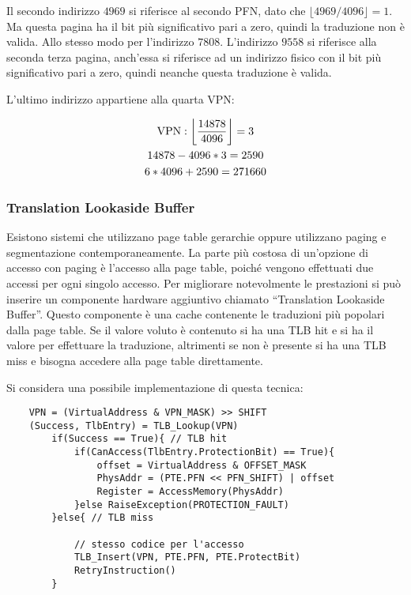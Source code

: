 \documentclass{article}
\numberwithin{equation}{subsection}
\begin{document}
Il secondo indirizzo $4969$ si riferisce al secondo PFN, dato che $\lfloor4969/4096\rfloor=1$. Ma questa pagina ha il bit più significativo pari a zero, quindi la traduzione 
non è valida. Allo stesso modo per l'indirizzo $7808$. L'indirizzo $9558$ si riferisce alla seconda terza pagina, anch'essa si riferisce ad un indirizzo fisico con 
il bit più significativo pari a zero, quindi neanche questa traduzione è valida. 

L'ultimo indirizzo appartiene alla quarta VPN: 

\begin{gather*}
    \mathrm{VPN}:\left\lfloor\displaystyle\frac{14878}{4096}\right\rfloor=3\\
    14878-4096*3=2590\\
    6*4096+2590=27166\theequation
\end{gather*}

\subsubsection{Translation Lookaside Buffer}

Esistono sistemi che utilizzano page table gerarchie oppure utilizzano paging e segmentazione contemporaneamente. 
La parte più costosa di un'opzione di accesso con paging è l'accesso alla page table, poiché vengono effettuati due accessi per ogni singolo accesso. 
Per migliorare notevolmente le prestazioni si può 
inserire un componente hardware aggiuntivo chiamato ``Translation Lookaside Buffer''. Questo componente è una cache contenente le traduzioni più popolari 
dalla page table. Se il valore voluto è contenuto si ha una TLB hit e si ha il valore per effettuare la traduzione, altrimenti se non è presente si ha una TLB miss 
e bisogna accedere alla page table direttamente. 


Si considera una possibile implementazione di questa tecnica: 

\begin{verbatim}
    VPN = (VirtualAddress & VPN_MASK) >> SHIFT
    (Success, TlbEntry) = TLB_Lookup(VPN)
        if(Success == True){ // TLB hit
            if(CanAccess(TlbEntry.ProtectionBit) == True){
                offset = VirtualAddress & OFFSET_MASK
                PhysAddr = (PTE.PFN << PFN_SHIFT) | offset
                Register = AccessMemory(PhysAddr)
            }else RaiseException(PROTECTION_FAULT)
        }else{ // TLB miss
            
            // stesso codice per l'accesso          
            TLB_Insert(VPN, PTE.PFN, PTE.ProtectBit)
            RetryInstruction()
        }   
\end{verbatim}
\end{document}
